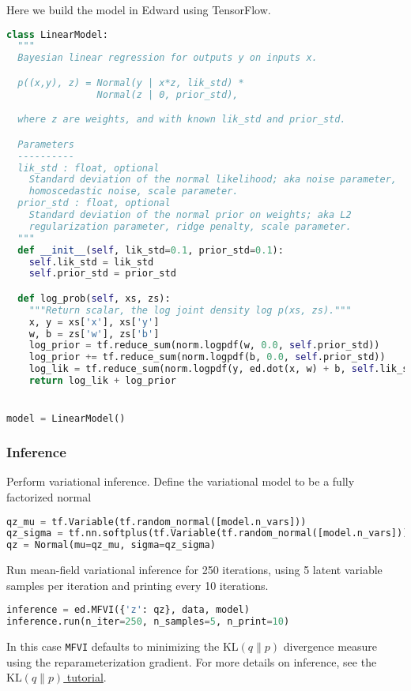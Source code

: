Here we build the model in Edward using TensorFlow.
\begin{lstlisting}[language=Python]
class LinearModel:
  """
  Bayesian linear regression for outputs y on inputs x.

  p((x,y), z) = Normal(y | x*z, lik_std) *
                Normal(z | 0, prior_std),

  where z are weights, and with known lik_std and prior_std.

  Parameters
  ----------
  lik_std : float, optional
    Standard deviation of the normal likelihood; aka noise parameter,
    homoscedastic noise, scale parameter.
  prior_std : float, optional
    Standard deviation of the normal prior on weights; aka L2
    regularization parameter, ridge penalty, scale parameter.
  """
  def __init__(self, lik_std=0.1, prior_std=0.1):
    self.lik_std = lik_std
    self.prior_std = prior_std

  def log_prob(self, xs, zs):
    """Return scalar, the log joint density log p(xs, zs)."""
    x, y = xs['x'], xs['y']
    w, b = zs['w'], zs['b']
    log_prior = tf.reduce_sum(norm.logpdf(w, 0.0, self.prior_std))
    log_prior += tf.reduce_sum(norm.logpdf(b, 0.0, self.prior_std))
    log_lik = tf.reduce_sum(norm.logpdf(y, ed.dot(x, w) + b, self.lik_std))
    return log_lik + log_prior


model = LinearModel()
\end{lstlisting}


\subsubsection{Inference}

Perform variational inference.
Define the variational model to be a fully factorized normal
\begin{lstlisting}[language=Python]
qz_mu = tf.Variable(tf.random_normal([model.n_vars]))
qz_sigma = tf.nn.softplus(tf.Variable(tf.random_normal([model.n_vars])))
qz = Normal(mu=qz_mu, sigma=qz_sigma)
\end{lstlisting}

Run mean-field variational inference for 250 iterations, using 5
latent variable samples per iteration and printing
every 10 iterations.
\begin{lstlisting}[language=Python]
inference = ed.MFVI({'z': qz}, data, model)
inference.run(n_iter=250, n_samples=5, n_print=10)
\end{lstlisting}
In this case \texttt{MFVI} defaults to minimizing the
$\text{KL}(q\|p)$ divergence measure using the reparameterization
gradient.
For more details on inference, see the \href{tut_KLqp.html}{$\text{KL}(q\|p)$ tutorial}.


